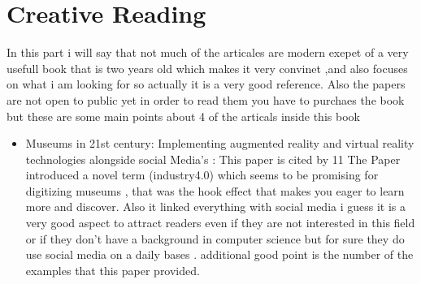\documentclass{article}
\begin{document}
\section{Creative Reading}
In this part i will say that not much of the articales are modern exepet of a very usefull book that is two years old which makes it very convinet ,and also focuses on what i am looking for so actually it is a very good reference.
Also the papers are not open to public yet in order to read them you have to purchaes the book 
but these are some main points about 4 of the articals inside this book
\newline
\begin{itemize}
    \item Museums in 21st century: Implementing augmented reality and virtual reality technologies alongside social Media's\cite{kargas2020reinventing} :
    \newline
    This paper is cited by 11 
    The Paper introduced a novel term (industry4.0) which seems to be  promising for digitizing museums , that was the hook effect that makes you eager to learn more and discover.
    Also it linked everything with social media i guess it is a very good aspect to attract readers even if they are not interested in this field or if they don't have a background in computer science but for sure they do use social media on a daily bases .
    additional good point is the number of the examples that this paper provided.
    

\end{itemize}
\end{document}
